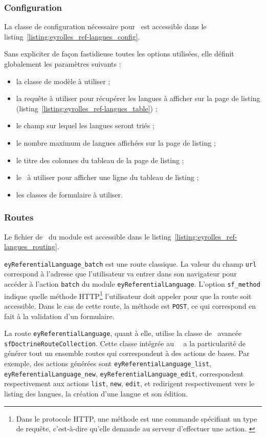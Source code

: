 \subsubsection{Configuration}

La classe de configuration nécessaire pour \asladmin\ est accessible dans le listing~\ref{listing:eyrolles_ref-langues_config}.

Sans expliciter de façon fastidieuse toutes les options utilisées, elle définit globalement les paramètres suivants :

\begin{itemize}
\item la classe de modèle à utiliser ;
\item la requête à utiliser pour récupérer les langues à afficher sur la page de listing (listing~\ref{listing:eyrolles_ref-langues_table}) ;
\item le champ sur lequel les langues seront triés ;
\item le nombre maximum de langues affichées sur la page de listing ;
\item le titre des colonnes du tableau de la page de listing ;
\item le \apartial\ à utiliser pour afficher une ligne du tableau de listing ;
\item les classes de formulaire à utiliser.
\end{itemize}


\subsubsection{Routes}

Le fichier de \arouting\ du module est accessible dans le listing~\ref{listing:eyrolles_ref-langues_routing}.

\texttt{eyReferentialLanguage\_batch} est une route classique. La valeur du champ \texttt{url} correspond à l'adresse que l'utilisateur va entrer dans son navigateur pour accéder à l'action \texttt{batch} du module \texttt{eyReferentialLanguage}. L'option \texttt{sf\_method} indique quelle méthode HTTP\footnote{Dans le protocole HTTP, une méthode est une commande spécifiant un type de requête, c'est-à-dire qu'elle demande au serveur d'effectuer une action. \cite{http}} l'utilisateur doit appeler pour que la route soit accessible. Dans le cas de cette route, la méthode est \texttt{POST}, ce qui correspond en fait à la validation d'un formulaire.

La route \texttt{eyReferentialLanguage}, quant à elle, utilise la classe de \arouting\ avancée \texttt{sfDoctrineRouteCollection}. Cette classe intégrée au \afm\ \asf\ a la particularité de générer tout un ensemble routes qui correspondent à des actions de bases. Par exemple, des actions générées sont \texttt{ey\-Re\-fe\-ren\-tial\-Lan\-guage\_\-list}, \texttt{ey\-Re\-fe\-ren\-tial\-Lan\-guage\_\-new}, \texttt{ey\-Re\-fe\-ren\-tial\-Lan\-guage\_\-edit}, correspondent respectivement aux actions \texttt{list}, \texttt{new}, \texttt{edit}, et redirigent respectivement vers le listing des langues, la création d'une langue et son édition.


